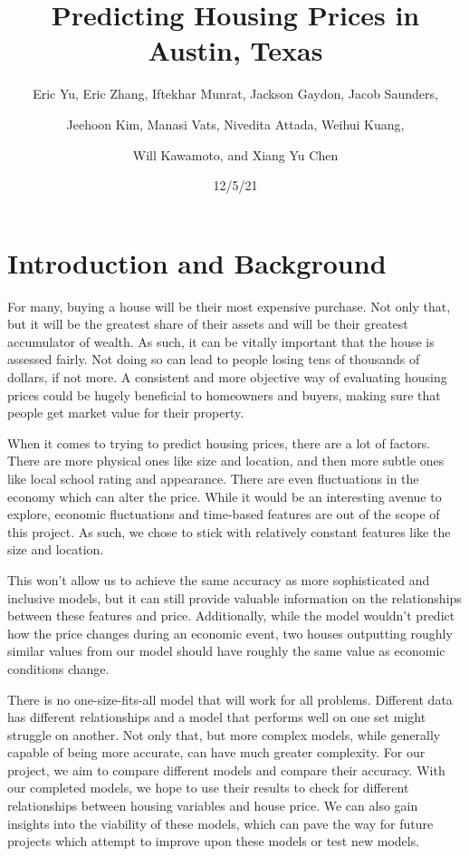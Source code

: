 \documentclass[12pt]{article}
\begin{document}
	\title{Predicting Housing Prices in Austin, Texas}
	\author{\small{Eric Yu, Eric Zhang, Iftekhar Munrat, Jackson Gaydon, Jacob Saunders,} \and \small{Jeehoon Kim, Manasi Vats, Nivedita Attada, Weihui Kuang,} \and \small{Will Kawamoto, and Xiang Yu Chen}}
	\date{12/5/21} 
	\maketitle
	
	\section{Introduction and Background} 
	
	For many, buying a house will be their most expensive purchase. Not only that, but it will be the greatest share of their assets and will be their greatest accumulator of wealth. As such, it can be vitally important that the house is assessed fairly. Not doing so can lead to people losing tens of thousands of dollars, if not more. A consistent and more objective way of evaluating housing prices could be hugely beneficial to homeowners and buyers, making sure that people get market value for their property.
	
	When it comes to trying to predict housing prices, there are a lot of factors. There are more physical ones like size and location, and then more subtle ones like local school rating and appearance. There are even fluctuations in the economy which can alter the price. While it would be an interesting avenue to explore, economic fluctuations and time-based features are out of the scope of this project. As such, we chose to stick with relatively constant features like the size and location.
	
	This won’t allow us to achieve the same accuracy as more sophisticated and inclusive models, but it can still provide valuable information on the relationships between these features and price. Additionally, while the model wouldn’t predict how the price changes during an economic event, two houses outputting roughly similar values from our model should have roughly the same value as economic conditions change. 
	
	There is no one-size-fits-all model that will work for all problems. Different data has different relationships and a model that performs well on one set might struggle on another. Not only that, but more complex models, while generally capable of being more accurate, can have much greater complexity. For our project, we aim to compare different models and compare their accuracy. With our completed models, we hope to use their results to check for different relationships between housing variables and house price. We can also gain insights into the viability of these models, which can pave the way for future projects which attempt to improve upon these models or test new models.
	
\end{document}
